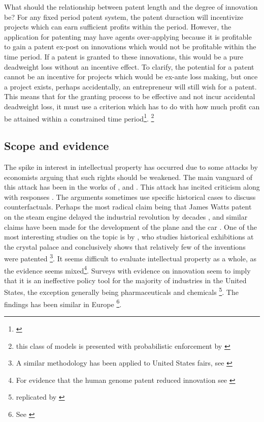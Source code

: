 What should the relationship between patent length and the degree of innovation be? For any fixed period patent system, the patent duraction will incentivize projects which can earn sufficient profits within the period. However, the application for patenting may have agents over-applying because it is profitable to gain a patent ex-post on innovations which would not be profitable within the time period. If a patent is granted to these innovations, this would be a pure deadweight loss without an incentive effect. To clarify, the potential for a patent cannot be an incentive for projects which would be ex-ante loss making, but once a project exists, perhaps accidentally, an entrepreneur will still wish for a patent. This means that for the granting process to be effective and not incur accidental deadweight loss, it must use a criterion which has to do with how much profit can be attained within a constrained time period\footnote{\cite{ODonoghue1998}}. \footnote{this class of models is presented with probabilistic enforcement by \cite{Chou2007} }

\subsection{Scope and evidence}

The spike in interest in intellectual property has occurred due to some attacks by economists arguing that such rights should be weakened. The main vanguard of this attack has been in the works of \cite{dosi2006much}, \cite{boldrinlevine} and  \cite{bessen2008patent}. This attack has incited criticism \citep{scherer2009michele} along with responses \citep{boldrin2013s}. The arguments sometimes use specific historical cases to discuss counterfactuals. Perhaps the most radical claim being that James Watts patent on the steam engine delayed the industrial revolution by decades \citep{boldrinlevine} \citep{nuvolari2004collective}, and similar claims have been made for the development of the plane and the car \citep{merges1994limiting}. One of the most interesting studies on the topic is by \cite{moser2005patent}, who studies historical exhibitions at the crystal palace and conclusively shows that relatively few of the inventions were patented \citep{moser2005patent}\footnote{A similar methodology has been applied to United States fairs, see \cite{khan2013going}}. It seems difficult to evaluate intellectual property as a whole, as the evidence seems mixed\footnote{For evidence that the human genome patent reduced innovation see \cite{williams2013intellectual}}. Surveys with evidence on innovation seem to imply that it is an ineffective policy tool for the majority of industries in the United States, the exception generally being pharmaceuticals and chemicals \footnote{\citep{mansfield1986patents} \citep{levin1987appropriating} replicated by \citep{cohen2000protecting}}. The findings has been similar in Europe \footnote{See \citep{arundel1998percentage}}. 

